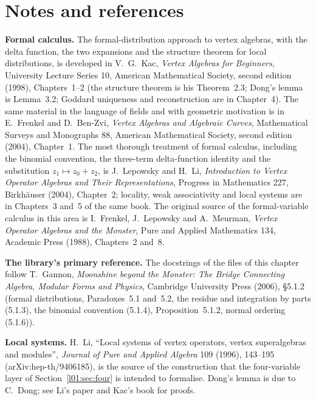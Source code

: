 \section{Notes and references}\label{l01:sec:notes}

\textbf{Formal calculus.} The formal-distribution approach to vertex algebras, with the delta function, the two expansions
and the structure theorem for local distributions, is developed in V.~G.~Kac, \emph{Vertex Algebras for Beginners},
University Lecture Series 10, American Mathematical Society, second edition (1998), Chapters~1--2 (the structure theorem
is his Theorem~2.3; Dong's lemma is Lemma~3.2; Goddard uniqueness and reconstruction are in Chapter~4). The same material
in the language of fields and with geometric motivation is in E.~Frenkel and D.~Ben-Zvi, \emph{Vertex Algebras and
Algebraic Curves}, Mathematical Surveys and Monographs 88, American Mathematical Society, second edition (2004),
Chapter~1. The most thorough treatment of formal calculus, including the binomial convention, the three-term delta-function
identity and the substitution $z_1\mapsto z_0+z_2$, is J.~Lepowsky and H.~Li, \emph{Introduction to Vertex Operator Algebras
and Their Representations}, Progress in Mathematics 227, Birkh\"auser (2004), Chapter~2; locality, weak associativity and
local systems are in Chapters~3 and~5 of the same book. The original source of the formal-variable calculus in this
area is I.~Frenkel, J.~Lepowsky and A.~Meurman, \emph{Vertex Operator Algebras and the Monster}, Pure and Applied
Mathematics 134, Academic Press (1988), Chapters~2 and~8.

\textbf{The library's primary reference.} The docstrings of the files of this chapter follow T.~Gannon, \emph{Moonshine
beyond the Monster: The Bridge Connecting Algebra, Modular Forms and Physics}, Cambridge University Press (2006),
§5.1.2 (formal distributions, Paradoxes~5.1 and~5.2, the residue and integration by parts (5.1.3), the binomial
convention (5.1.4), Proposition~5.1.2, normal ordering (5.1.6)).

\textbf{Local systems.} H.~Li, ``Local systems of vertex operators, vertex superalgebras and modules'', \emph{Journal of
Pure and Applied Algebra} 109 (1996), 143--195 (arXiv:hep-th/9406185), is the source of the construction that the
four-variable layer of Section~\ref{l01:sec:four} is intended to formalise. Dong's lemma is due to C.~Dong; see Li's paper
and Kac's book for proofs.

